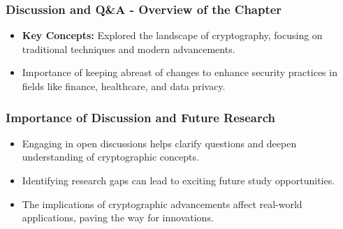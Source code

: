 \documentclass{beamer}
\begin{document}
\begin{frame}[fragile]
    \frametitle{Discussion and Q\&A - Overview of the Chapter}
    \begin{itemize}
        \item \textbf{Key Concepts:} Explored the landscape of cryptography, focusing on traditional techniques and modern advancements.
        \item Importance of keeping abreast of changes to enhance security practices in fields like finance, healthcare, and data privacy.
    \end{itemize}
\end{frame}

\begin{frame}[fragile]
    \frametitle{Importance of Discussion and Future Research}
    \begin{itemize}
        \item Engaging in open discussions helps clarify questions and deepen understanding of cryptographic concepts.
        \item Identifying research gaps can lead to exciting future study opportunities.
        \item The implications of cryptographic advancements affect real-world applications, paving the way for innovations.
    \end{itemize}
\end{frame}
\end{document}
